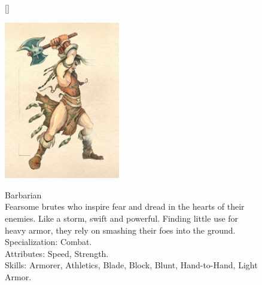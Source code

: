 \documentclass[12pt]{book}
\begin{document}
\begin{figure}[H]
[\FBwidth]
{\caption*{Barbarian\\

Fearsome brutes who inspire fear and dread in the hearts of their enemies. Like a storm, swift and powerful. Finding little use for heavy armor, they rely on smashing their foes into the ground.\\

Specialization: Combat.\\

Attributes: Speed, Strength.\\

Skills: Armorer, Athletics, Blade, Block, Blunt, Hand-to-Hand, Light Armor.}\label{fig:test}}
{\includegraphics[width=0.45\textwidth]{Barbarian.png}}
\end{figure}
\end{document}

